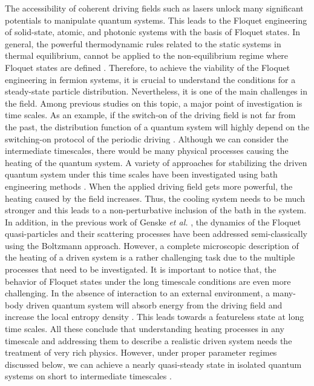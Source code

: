 \documentclass{article}
\begin{document}
The accessibility of coherent driving fields such as lasers unlock many significant potentials to manipulate quantum systems. This leads to the Floquet engineering of solid-state, atomic, and photonic systems with the basis of Floquet states. In general, the powerful thermodynamic rules related to the static systems in thermal equilibrium, cannot be applied to the non-equilibrium regime where Floquet states are defined \cite{seetharam2015}. Therefore, to achieve the viability of the Floquet engineering in fermion systems, it is crucial to understand the conditions for a steady-state particle distribution. Nevertheless, it is one of the main challenges in the field. Among previous studies on this topic, a major point of investigation is time scales. As an example, if the switch-on of the driving field is not far from the past, the distribution function of a quantum system will highly depend on the switching-on protocol of the periodic driving \cite{dehghani2014}. Although we can consider the intermediate timescales, there would be many physical processes causing the heating of the quantum system. A variety of approaches for stabilizing the driven quantum system under this time scales have been investigated using bath engineering methods \cite{seetharam2015,weidinger2017,seetharam2019,rudner2020}. When the applied driving field gets more powerful, the heating caused by the field increases. Thus, the cooling system needs to be much stronger and this leads to a non-perturbative inclusion of the bath in the system. In addition, in the previous work of Genske \textit{et al.} \cite{genske2015}, the dynamics of the Floquet quasi-particles and their scattering processes have been addressed semi-classically using the Boltzmann approach.
However, a complete microscopic description of the heating of a driven system is a rather challenging task due to the multiple processes that need to be investigated.
It is important to notice that, the behavior of Floquet states under the long timescale conditions are even more challenging. In the absence of interaction to an external environment, a many-body driven quantum system will absorb energy from the driving field and increase the local entropy density \cite{rudner2020}. This leads towards a featureless state at long time scales. All these conclude that understanding heating processes in any timescale and addressing them to describe a realistic driven system needs the treatment of very rich physics. However, under proper parameter regimes discussed below, we can achieve a nearly quasi-steady state in isolated quantum systems on short to intermediate timescales \cite{lindner2017,bukov2015,eckardt2015,kuwahara2016,abanin2017,mori2018,rudner2020}.
\end{document}
